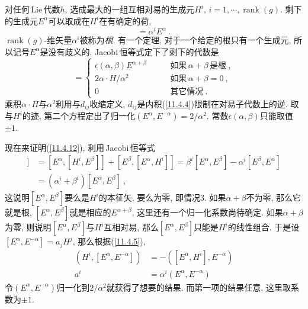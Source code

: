 对任何\,Lie\,代数$ h$, 选成最大的一组互相对易的生成元$ H^{i}$, $i=1,\cdots,\operatorname{rank}(g)$. 剩下的生成元$ E^{\alpha} $可以取成在$ H^{i} $在有确定的荷,
\begin{equation}
    [H^{i},E^{\alpha}]=\alpha^{i}E^{\alpha} \:. \label{11.4.11}
\end{equation}
$\operatorname{rank}(g)$-维矢量$ \alpha^{i} $被称为{\emph{根}}. 有一个定理, 对于一个给定的根只有一个生成元, 所以记号$ E^{\alpha} $是没有歧义的. Jacobi\,恒等式定下了剩下的代数是
\begin{equation}
    [E^{\alpha},E^{\beta}] = 
    \begin{cases}
     \epsilon(\alpha,\beta) E^{\alpha+\beta} &\qquad \text{如果}\,\alpha+\beta\,\text{是根} \:, \\
     2\alpha\cdot H/\alpha^{2} &\qquad \text{如果}\,\alpha+\beta=0\:, \\
     0 &\qquad \text{其它情况} \:.
    \end{cases} \label{11.4.12}
\end{equation}
乘积$ \alpha\cdot H $与$ \alpha^{2} $利用与$ d_{ij} $收缩定义, $d_{ij} $是内积(\ref{11.4.4})限制在对易子代数上的逆. 取与$ H^{i} $的迹, 第二个方程定出了归一化$ (E^{\alpha},E^{-\alpha})=2/\alpha^{2}$. 常数$ \epsilon(\alpha,\beta) $只能取值$ \pm1$.
\begin{tcolorbox}
现在来证明(\ref{11.4.12}), 利用\,Jacobi\,恒等式
\begin{align*}
    [H^{i},[E^{\alpha},E^{\beta}]] &= [E^{\alpha},[H^{i},E^{\beta}]] + [E^{\beta},[E^{\alpha},H^{i}]]
    = \beta^{i}[E^{\alpha},E^{\beta}] - \alpha^{i} [E^{\beta},E^{\alpha}] \\
    &= (\alpha^{i}+\beta^{i})[E^{\alpha},E^{\beta}] \:,
\end{align*}
这说明$ [E^{\alpha},E^{\beta}] $要么是$ H^{i} $的本征矢, 要么为零, 即情况3. 如果$ \alpha+\beta $不为零, 那么它就是根, $[E^{\alpha},E^{\beta}] $就是相应的$ E^{\alpha+\beta}$, 这里还有一个归一化系数尚待确定. 如果$ \alpha+\beta $为零, 则说明$ [E^{\alpha},E^{\beta}] $与$ H^{i} $互相对易, 那么$ [E^{\alpha},E^{\beta}] $只能是$ H^{i} $的线性组合. 于是设$ [E^{\alpha},E^{-\alpha}]= a_{j}H^{j}$, 那么根据(\ref{11.4.5}),
\begin{align*}
    (H^{i},[E^{\alpha},E^{-\alpha}])&= -([E^{\alpha},H^{i}],E^{-\alpha}) \\
        a^{i} & = \alpha^{i}(E^{\alpha},E^{-\alpha}) 
\end{align*}
令$ (E^{\alpha},E^{-\alpha}) $归一化到$ 2/\alpha^{2} $就获得了想要的结果. 而第一项的结果任意, 这里取系数为$ \pm1$.
\end{tcolorbox}

